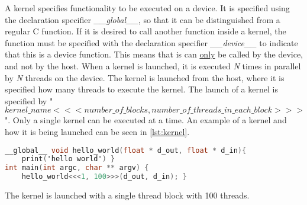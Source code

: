 A kernel specifies functionality to be executed on a device.
It is specified using the declaration specifier \textit{\_\_global\_\_}, so that it can be distinguished from a regular C function.
If it is desired to call another function inside a kernel, the function must be specified with the declaration specifier \textit{\_\_device\_\_} to indicate that this is a device function.
This means that is can \underline{only} be called by the device, and not by the host.
When a kernel is launched, it is executed \textit{N} times in parallel by \textit{N} threads on the device.
The kernel is launched from the host, where it is specified how many \cuda{} threads to execute the kernel.
The launch of a kernel is specified by "$kernel\_name<<< number\_of\_blocks, number\_of\_threads\_in\_each\_block >>>$".
Only a single kernel can be executed at a time.
An example of a kernel and how it is being launched can be seen in \autoref{lst:kernel}.
\begin{lstlisting}[language=C,caption={Kernel example},label=lst:kernel]
__global__ void hello_world(float * d_out, float * d_in){
	print('hello world') }
int main(int argc, char ** argv) {
	hello_world<<<1, 100>>>(d_out, d_in); }
\end{lstlisting}
The kernel is launched with a single thread block with 100 threads.